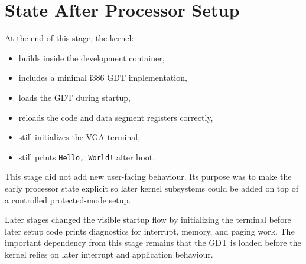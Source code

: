 \section{State After Processor Setup}

At the end of this stage, the kernel:
\begin{itemize}
  \item builds inside the development container,
  \item includes a minimal i386 GDT implementation,
  \item loads the GDT during startup,
  \item reloads the code and data segment registers correctly,
  \item still initializes the VGA terminal,
  \item still prints \texttt{Hello, World!} after boot.
\end{itemize}

This stage did not add new user-facing behaviour. Its purpose was to make the early processor state explicit so later kernel subsystems could be added on top of a controlled protected-mode setup.

Later stages changed the visible startup flow by initializing the terminal before later setup code prints diagnostics for interrupt, memory, and paging work. The important dependency from this stage remains that the GDT is loaded before the kernel relies on later interrupt and application behaviour.
